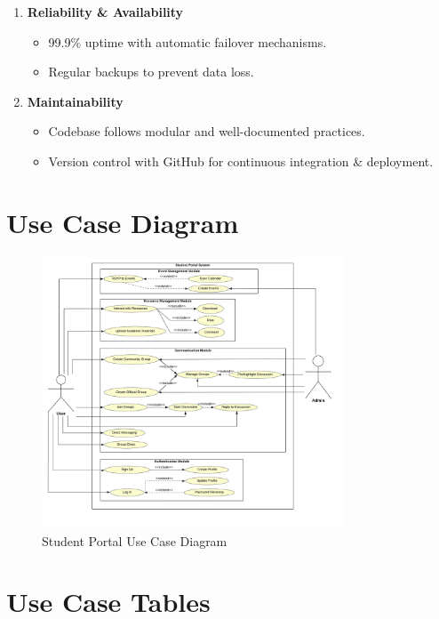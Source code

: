 \begin{enumerate}
    \item \textbf{Reliability \& Availability}
    \begin{itemize}
        \item 99.9\% uptime with automatic failover mechanisms.
        \item Regular backups to prevent data loss.
    \end{itemize}

    \item \textbf{Maintainability}
    \begin{itemize}
        \item Codebase follows modular and well-documented practices.
        \item Version control with GitHub for continuous integration \& deployment.
    \end{itemize}
\end{enumerate}

\section{Use Case Diagram}
\begin{figure}[H]
    \centering
    \includegraphics[width=0.8\textwidth]{images/use_case_diagram.png}
    \caption{Student Portal Use Case Diagram}
    \label{fig:use_case}
\end{figure}



\section{Use Case Tables}

